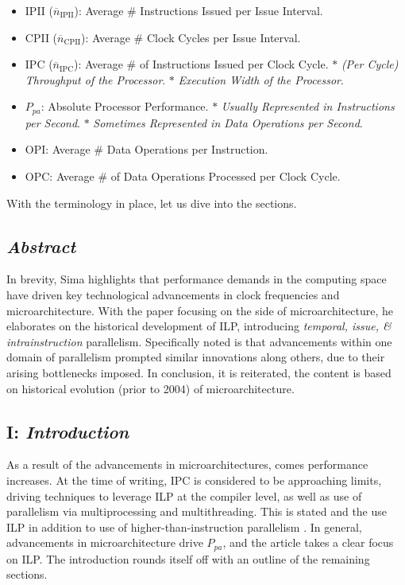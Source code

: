 \documentclass{article}
\begin{document}
\begin{itemize}
    \item IPII (\(\overline{n}_\text{IPII}\)): Average \# Instructions Issued per Issue Interval.
    \item CPII (\(\overline{n}_\text{CPII}\)): Average \# Clock Cycles per Issue Interval.
    \item IPC (\(\overline{n}_\text{IPC}\)): Average \# of Instructions Issued per Clock Cycle.
    \subitem \(\ast\) \emph{(Per Cycle) Throughput of the Processor}.
    \subitem \(\ast\) \emph{Execution Width of the Processor}.
    \item \(P_{pa}\): Absolute Processor Performance.
    \subitem \(\ast\) \emph{Usually Represented in Instructions per Second}.
    \subitem \(\ast\) \emph{Sometimes Represented in Data Operations per Second}.
    \item OPI: Average \# Data Operations per Instruction.
    \item OPC: Average \# of Data Operations Processed per Clock Cycle.
\end{itemize}
With the terminology in place, let us dive into the sections.

\subsection{\emph{Abstract}}
In brevity, Sima highlights that performance demands in the computing space have driven key technological advancements in clock frequencies and microarchitecture.
With the paper focusing on the side of microarchitecture, he elaborates on the historical development of ILP, introducing \emph{temporal, issue, \& intrainstruction} parallelism.
Specifically noted is that advancements within one domain of parallelism prompted similar innovations along others, due to their arising bottlenecks imposed.
In conclusion, it is reiterated, the content is based on historical evolution (prior to 2004) of microarchitecture.

\subsection{\textbf{I}: \emph{Introduction}}
As a result of the advancements in microarchitectures, comes performance increases.
At the time of writing, IPC is considered to be approaching limits, driving techniques to leverage ILP at the compiler level, as well as use of parallelism via multiprocessing and multithreading.
This is stated and the use ILP in addition to use of higher-than-instruction parallelism \cite{Sima}.
In general, advancements in microarchitecture drive \(P_{pa}\), and the article takes a clear focus on ILP.
The introduction rounds itself off with an outline of the remaining sections.
\end{document}
